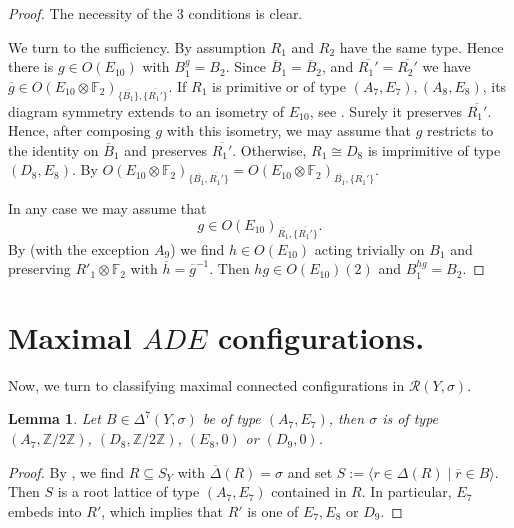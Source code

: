 \documentclass[a4paper]{amsart}
\theoremstyle{definition}
\theoremstyle{plain}
\newtheorem{lemma}[definition]{Lemma}
\newcommand{\FF}{\mathbb{F}}
\newcommand{\ZZ}{\mathbb{Z}}
\newcommand{\R}{\mathcal{R}}
\begin{document}
\begin{proof}
The necessity of the $3$ conditions is clear.

We turn to the sufficiency. By assumption $R_1$ and $R_2$ have the same type. Hence there is $g \in O(E_{10})$ with $B_1^g = B_2$.
Since $\overline{B}_1=\overline{B}_2$, and $\overline{R_1'}=\overline{R_2'}$ we have $\overline{g} \in O(E_{10}\otimes \FF_2)_{\{\overline{B_1}\},\{\overline{R_1'}\}}$.
If $R_1$ is primitive or of type $(A_7,E_7),(A_8,E_8)$, its diagram symmetry extends to an isometry of $E_{10}$, see . Surely it preserves $\overline{R_1'}$. Hence, after composing $g$ with this isometry, we may assume that $g$ restricts to the identity on $\overline{B}_1$ and preserves $\overline{R_1'}$.
Otherwise, $R_1\cong D_8$ is imprimitive of type $(D_8,E_8)$.
By 
$O(E_{10}\otimes \FF_2)_{\{\overline{B_1},\overline{R_1'}\}}=O(E_{10}\otimes \FF_2)_{\overline{B_1}, \{\overline{R_1'}\}}$.

In any case we may assume that 
\[g\in O(E_{10})_{\overline{R_1},\{\overline{R_1'}\}}.\]
By  (with the exception $A_9$) we find $h \in O(E_{10})$ acting trivially on $B_1$ and preserving $R'_1 \otimes \FF_2$ with $\overline{h}=\overline{g}^{-1}$. Then $hg \in O(E_{10})(2)$ and $B_1^{hg}=B_2$.
\end{proof}


\section{Maximal $ADE$ configurations.}\label{sec:maximal-ADE}
Now, we turn to classifying maximal connected configurations in $\R(Y,\sigma)$.






\begin{lemma}\label{lem:excludeA7E7}
Let $B \in \Delta^7(Y,\sigma)$ be of type $(A_7,E_7)$, then $\sigma$ 
is of type $(A_7, \ZZ/2\ZZ)$, $(D_8, \ZZ/2\ZZ)$, $(E_8, 0)$ or $(D_9, 0)$.
\end{lemma}
\begin{proof}
By , we find $R \subseteq S_Y$ with $\overline{\Delta}(R)=\sigma$ and set 
$S:=\langle r \in \Delta(R) \mid \overline{r} \in B\rangle$. Then $S$ is a root lattice of type $(A_7,E_7)$ contained in $R$. In particular, $E_7$ embeds into $R'$, which implies that $R'$ is one of $E_7,E_8$ or $D_9$.  
\end{proof}
\end{document}
